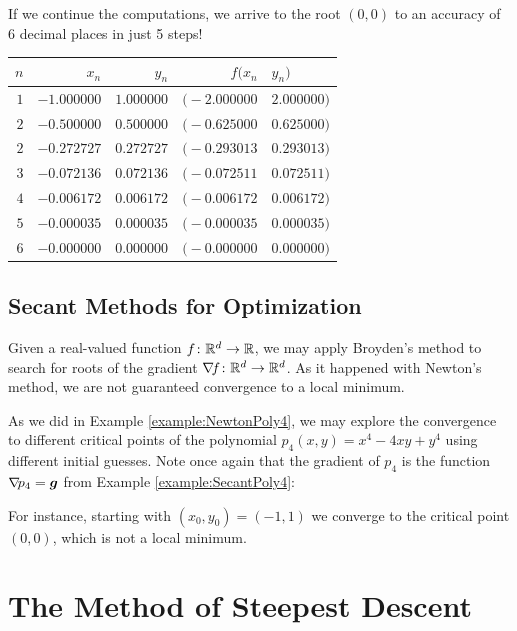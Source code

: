 \begin{example}
If we continue the computations, we arrive to the root $(0,0)$ to an accuracy of 6 decimal places in just 5 steps!
\begin{center}
\begin{tabular}{|r|r|r|r@{, }l|} \hline 
$n$ & $x_n$ & $y_n$ & $f(x_n$ & $y_n)$ \\ \hline \hline 
$1$ & $-1.000000$ & $1.000000$ & $\big(-2.000000$ & $2.000000 \big)$ \\ \hline 
$2$ & $-0.500000$ & $0.500000$ & $\big(-0.625000$ & $0.625000 \big)$ \\ \hline 
$2$ & $-0.272727$ & $0.272727$ & $\big(-0.293013$ & $0.293013 \big)$ \\ \hline 
$3$ & $-0.072136$ & $0.072136$ & $\big(-0.072511$ & $0.072511 \big)$ \\ \hline 
$4$ & $-0.006172$ & $0.006172$ & $\big(-0.006172$ & $0.006172 \big)$ \\ \hline 
$5$ & $-0.000035$ & $0.000035$ & $\big(-0.000035$ & $0.000035 \big)$ \\ \hline 
$6$ & $-0.000000$ & $0.000000$ & $\big(-0.000000$ & $0.000000 \big)$ \\ \hline 
\end{tabular}
\end{center}
\end{example}

\subsection{Secant Methods for Optimization}

Given a real-valued function $f \colon \mathbb{R}^d \to \mathbb{R}$, we may apply Broyden's method to search for roots of the gradient $\mathop{\nabla\! {f}} \colon \mathbb{R}^d \to \mathbb{R}^d$.  As it happened with Newton's method, we are not guaranteed convergence to a local minimum.

\begin{example}
As we did in Example \ref{example:NewtonPoly4}, we may explore the convergence to different critical points of the polynomial $p_4(x,y) = x^4-4xy+y^4$ using different initial guesses.  Note once again that the gradient of $p_4$ is the function $\mathop{\nabla\! {p_4}} = \boldsymbol{g}$ from Example \ref{example:SecantPoly4}:

For instance, starting with $(x_0,y_0) = (-1,1)$ we converge to the critical point $(0,0)$, which is not a local minimum.
\end{example}

\section{The Method of Steepest Descent}

